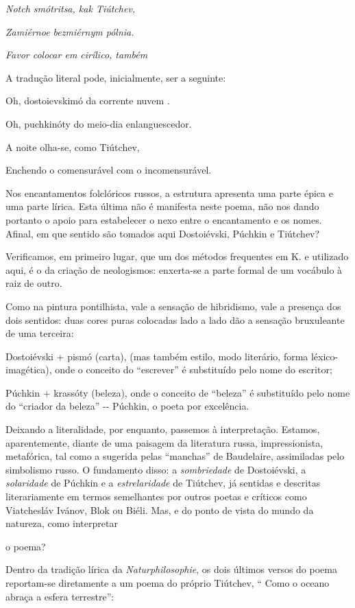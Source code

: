 \emph{Notch smótritsa, kak Tiútchev,}

\emph{Zamiérnoe bezmiérnym pólnia.}

\emph{Favor colocar em cirílico, também}

A tradução literal pode, inicialmente, ser a seguinte:

Oh, dostoievskimó da corrente nuvem .

Oh, puchkinóty do meio-dia enlanguescedor.

A noite olha-se, como Tiútchev,

Enchendo o comensurável com o incomensurável.

Nos encantamentos folclóricos russos, a estrutura apresenta uma parte
épica e uma parte lírica. Esta última não é manifesta neste poema, não
nos dando portanto o apoio para estabelecer o nexo entre o encantamento
e os nomes. Afinal, em que sentido são tomados aqui Dostoiévski, Púchkin
e Tiútchev?

Verificamos, em primeiro lugar, que um dos métodos frequentes em K. e
utilizado aqui, é o da criação de neologismos: enxerta-se a parte formal
de um vocábulo à raiz de outro.

Como na pintura pontilhista, vale a sensação de hibridismo, vale a
presença dos dois sentidos: duas cores puras colocadas lado a lado dão a
sensação bruxuleante de uma terceira:

Dostoiévski + pismó (carta), (mas também estilo, modo literário, forma
léxico-imagética), onde o conceito do ``escrever'' é substituído pelo
nome do escritor;

Púchkin + krassóty (beleza), onde o conceito de ``beleza'' é substituído
pelo nome do ``criador da beleza'' -\/- Púchkin, o poeta por excelência.

Deixando a literalidade, por enquanto, passemos à interpretação.
Estamos, aparentemente, diante de uma paisagem da literatura russa,
impressionista, metafórica, tal como a sugerida pelas ``manchas'' de
Baudelaire, assimiladas pelo simbolismo russo. O fundamento disso: a
\emph{sombriedade} de Dostoiévski, a \emph{solaridade} de Púchkin e a
\emph{estrelaridade} de Tiútchev, já sentidas e descritas literariamente
em termos semelhantes por outros poetas e críticos como Viatchesláv
Ivánov, Blok ou Biéli. Mas, e do ponto de vista do mundo da natureza,
como interpretar

o poema?

Dentro da tradição lírica da \emph{Naturphilosophie}, os dois últimos
versos do poema reportam-se diretamente a um poema do próprio Tiútchev,
`` Como o oceano abraça a esfera terrestre'':

